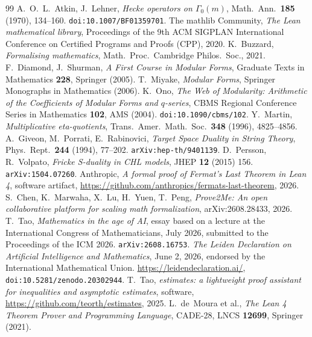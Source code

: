 \documentclass[11pt, a4paper]{article}
\theoremstyle{remark}
\begin{document}
\begin{thebibliography}{99}
 A.~O.~L.~Atkin, J.~Lehner, \textit{Hecke operators on $\Gamma_0(m)$}, Math.\ Ann.\ \textbf{185} (1970), 134--160. \texttt{doi:10.1007/BF01359701}.
 The mathlib Community, \textit{The Lean mathematical library}, Proceedings of the 9th ACM SIGPLAN International Conference on Certified Programs and Proofs (CPP), 2020.
 K.~Buzzard, \textit{Formalising mathematics}, Math.\ Proc.\ Cambridge Philos.\ Soc., 2021.
 F.~Diamond, J.~Shurman, \textit{A First Course in Modular Forms}, Graduate Texts in Mathematics \textbf{228}, Springer (2005).
 T.~Miyake, \textit{Modular Forms}, Springer Monographs in Mathematics (2006).
 K.~Ono, \textit{The Web of Modularity: Arithmetic of the Coefficients of Modular Forms and $q$-series}, CBMS Regional Conference Series in Mathematics \textbf{102}, AMS (2004). \texttt{doi:10.1090/cbms/102}.
 Y.~Martin, \textit{Multiplicative eta-quotients}, Trans.\ Amer.\ Math.\ Soc.\ \textbf{348} (1996), 4825--4856.
 A.~Giveon, M.~Porrati, E.~Rabinovici, \textit{Target Space Duality in String Theory}, Phys.\ Rept.\ \textbf{244} (1994), 77--202. \texttt{arXiv:hep-th/9401139}.
 D.~Persson, R.~Volpato, \textit{Fricke S-duality in CHL models}, JHEP \textbf{12} (2015) 156. \texttt{arXiv:1504.07260}.
 Anthropic, \textit{A formal proof of Fermat's Last Theorem in Lean 4}, software artifact, \url{https://github.com/anthropics/fermats-last-theorem}, 2026.
 S.~Chen, K.~Marwaha, X.~Lu, H.~Yuen, T.~Peng, \textit{Prove2Me: An open collaborative platform for scaling math formalization}, arXiv:2608.28433, 2026.
 T.~Tao, \textit{Mathematics in the age of AI}, essay based on a lecture at the
International Congress of Mathematicians, July 2026, submitted to the Proceedings of the ICM 2026.
\texttt{arXiv:2608.16753}.
 \textit{The Leiden Declaration on Artificial Intelligence and Mathematics},
June 2, 2026, endorsed by the International Mathematical Union. \url{https://leidendeclaration.ai/},
\texttt{doi:10.5281/zenodo.20302944}.
 T.~Tao, \textit{estimates: a lightweight proof assistant for inequalities and asymptotic estimates}, software, \url{https://github.com/teorth/estimates}, 2025.
 L.~de~Moura et al., \textit{The Lean 4 Theorem Prover and Programming Language}, CADE-28, LNCS \textbf{12699}, Springer (2021).
\end{thebibliography}
\end{document}
